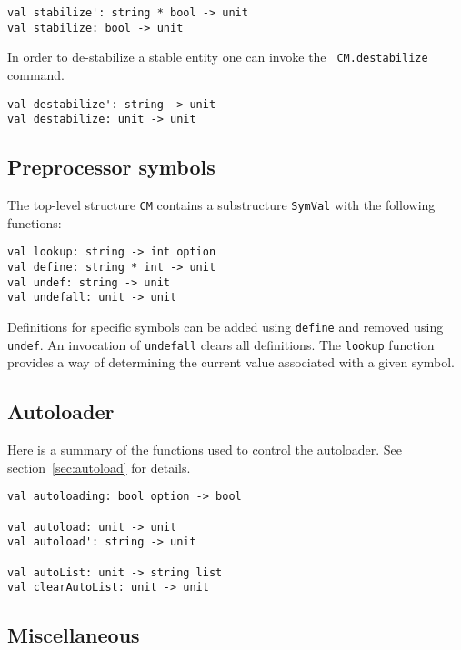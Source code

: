 \documentclass{article}
\begin{document}
\begin{verbatim}
val stabilize': string * bool -> unit
val stabilize: bool -> unit
\end{verbatim}
In order to de-stabilize a stable entity one can invoke the {\tt
CM.destabilize} command.
\begin{verbatim}
val destabilize': string -> unit
val destabilize: unit -> unit
\end{verbatim}

\subsection{Preprocessor symbols}

The top-level structure {\tt CM} contains a substructure {\tt SymVal}
with the following functions:

\begin{verbatim}
val lookup: string -> int option
val define: string * int -> unit
val undef: string -> unit
val undefall: unit -> unit
\end{verbatim}

Definitions for specific symbols can be added using {\tt define} and
removed using {\tt undef}.  An invocation of {\tt undefall} clears all
definitions.  The {\tt lookup} function provides a way of determining
the current value associated with a given symbol.

\subsection{Autoloader}

Here is a summary of the functions used to control the autoloader. See
section~\ref{sec:autoload} for details.

\begin{verbatim}
val autoloading: bool option -> bool

val autoload: unit -> unit
val autoload': string -> unit

val autoList: unit -> string list
val clearAutoList: unit -> unit
\end{verbatim}

\subsection{Miscellaneous}

\label{section:path}
\end{document}
